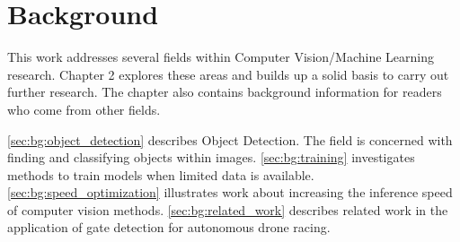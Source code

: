 \chapter{Background}
\label{sec:background}
	This work addresses several fields within Computer Vision/Machine Learning research. Chapter 2 explores these areas and builds up a solid basis to carry out further research. The chapter also contains background information for readers who come from other fields.
	
	\autoref{sec:bg:object_detection} describes Object Detection. The field is concerned with finding and classifying objects within images. \autoref{sec:bg:training} investigates methods to train models when limited data is available. \autoref{sec:bg:speed_optimization} illustrates work about increasing the inference speed of computer vision methods. \autoref{sec:bg:related_work} describes related work in the application of gate detection for autonomous drone racing.

%
\newpage

\newpage

\newpage
